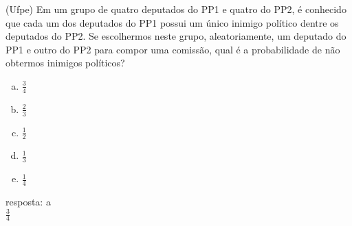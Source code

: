 \begin{ex}
 (Ufpe) Em um grupo de quatro deputados do PP1 e quatro do PP2, é conhecido que cada um dos deputados do PP1 possui um único inimigo político dentre os deputados do PP2. Se escolhermos neste grupo, aleatoriamente, um deputado do PP1 e outro do PP2 para compor uma comissão, qual é a probabilidade de não obtermos inimigos políticos?
   \begin{enumerate}[(a)]
   \item $\frac{3}{4}$
   \item $\frac{2}{3}$
   \item $\frac{1}{2}$
   \item $\frac{1}{3}$
   \item $\frac{1}{4}$
   \end{enumerate}
     \begin{sol}
      resposta: a \\
      $\frac{3}{4}$
     \end{sol}
\end{ex}